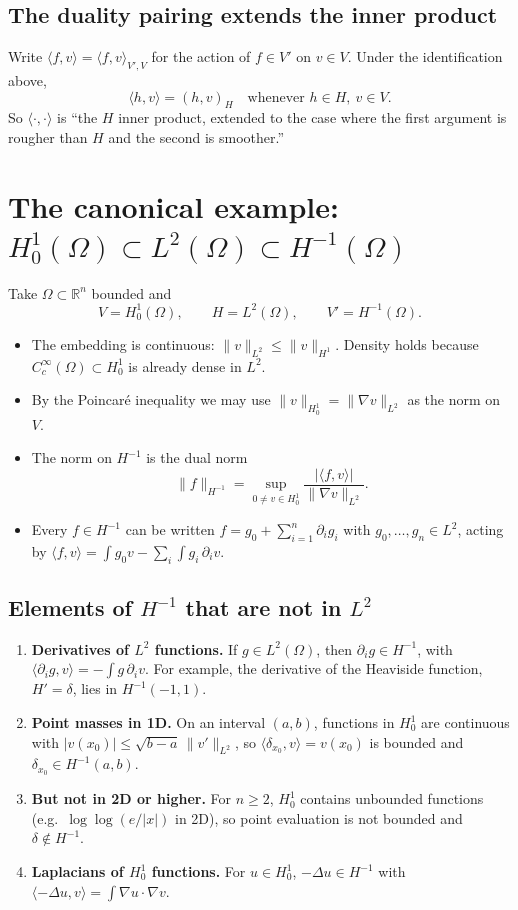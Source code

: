 \documentclass[11pt]{article}
\newcommand{\R}{\mathbb{R}}
\newcommand{\Cc}{C_c^\infty}
\newcommand{\pair}[2]{\langle #1, #2 \rangle}
\newcommand{\ip}[2]{( #1, #2 )}
\newcommand{\lap}{\Delta}
\newcommand{\grad}{\nabla}
\theoremstyle{definition}
\theoremstyle{plain}
\begin{document}
\subsection*{The duality pairing extends the inner product}

Write $\pair{f}{v}=\pair{f}{v}_{V',V}$ for the action of $f\in V'$ on $v\in V$.
Under the identification above,
\[
  \boxed{\;\pair{h}{v} = \ip{h}{v}_H \quad\text{whenever } h\in H,\ v\in V.\;}
\]
So $\pair{\cdot}{\cdot}$ is ``the $H$ inner product, extended to the case where
the first argument is rougher than $H$ and the second is smoother.''

\section{The canonical example: $H^1_0(\Omega)\subset L^2(\Omega)\subset H^{-1}(\Omega)$}

Take $\Omega\subset\R^n$ bounded and
\[
  V=H^1_0(\Omega), \qquad H=L^2(\Omega), \qquad V'=H^{-1}(\Omega).
\]
\begin{itemize}
  \item The embedding is continuous: $\|v\|_{L^2}\le\|v\|_{H^1}$. Density holds
    because $\Cc(\Omega)\subset H^1_0$ is already dense in $L^2$.
  \item By the Poincar\'e inequality we may use
    $\|v\|_{H^1_0}=\|\grad v\|_{L^2}$ as the norm on $V$.
  \item The norm on $H^{-1}$ is the dual norm
    \[
      \|f\|_{H^{-1}} = \sup_{0\ne v\in H^1_0}
      \frac{|\pair{f}{v}|}{\|\grad v\|_{L^2}} .
    \]
  \item Every $f\in H^{-1}$ can be written $f=g_0+\sum_{i=1}^n\partial_i g_i$
    with $g_0,\dots,g_n\in L^2$, acting by
    $\pair{f}{v}=\int g_0v-\sum_i\int g_i\,\partial_i v$.
\end{itemize}

\subsection*{Elements of $H^{-1}$ that are not in $L^2$}

\begin{enumerate}
  \item \textbf{Derivatives of $L^2$ functions.} If $g\in L^2(\Omega)$, then
    $\partial_i g\in H^{-1}$, with $\pair{\partial_i g}{v}=-\int g\,\partial_i v$.
    For example, the derivative of the Heaviside function, $H'=\delta$, lies in
    $H^{-1}(-1,1)$.
  \item \textbf{Point masses in 1D.} On an interval $(a,b)$, functions in
    $H^1_0$ are continuous with
    $|v(x_0)|\le\sqrt{b-a}\,\|v'\|_{L^2}$, so
    $\pair{\delta_{x_0}}{v}=v(x_0)$ is bounded and $\delta_{x_0}\in H^{-1}(a,b)$.
  \item \textbf{But not in 2D or higher.} For $n\ge2$, $H^1_0$ contains
    unbounded functions (e.g.\ $\log\log(e/|x|)$ in 2D), so point evaluation is
    not bounded and $\delta\notin H^{-1}$.
  \item \textbf{Laplacians of $H^1_0$ functions.} For $u\in H^1_0$,
    $-\lap u\in H^{-1}$ with $\pair{-\lap u}{v}=\int\grad u\cdot\grad v$.
\end{enumerate}
\end{document}
